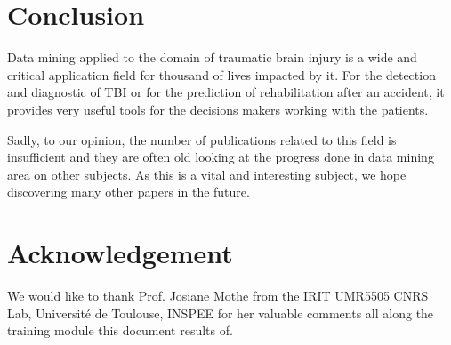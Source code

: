 \documentclass[runningheads]{llncs}
\begin{document}
\section{Conclusion}

Data mining applied to the domain of traumatic brain injury is a wide and critical application field for thousand of lives impacted by it. For the detection and diagnostic of TBI or for the prediction of rehabilitation after an accident, it provides very useful tools for the decisions makers working with the patients.

Sadly, to our opinion, the number of publications related to this field is insufficient and they are often old looking at the progress done in data mining area on other subjects. As this is a vital and interesting subject, we hope discovering many other papers in the future.

\section*{Acknowledgement}
We would like to thank Prof. Josiane Mothe from the IRIT UMR5505 CNRS Lab, Université de Toulouse, INSPEE for her valuable comments all along the training module this document results of.    

\newpage



\end{document}
